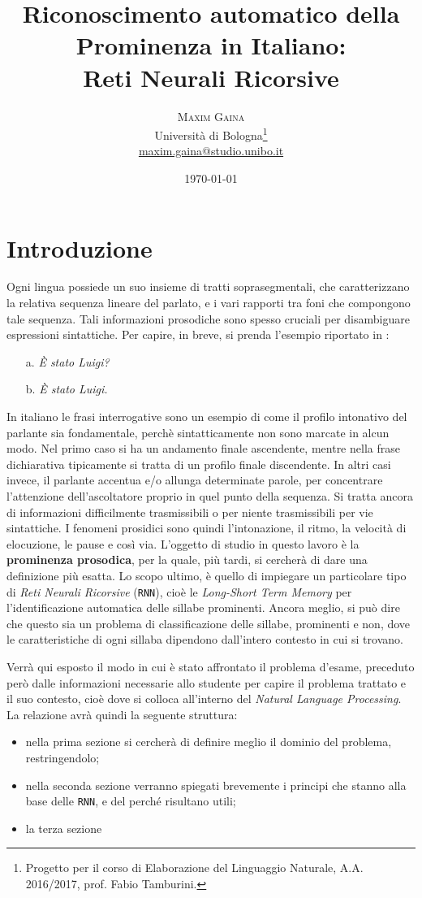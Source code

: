 \documentclass[twoside,twocolumn,10pt]{extarticle}
\title{Riconoscimento automatico della Prominenza in Italiano:\\Reti Neurali Ricorsive} %
\author{%
\textsc{Maxim Gaina} \\[1ex] %
\normalsize Università di Bologna\thanks{Progetto per il corso di Elaborazione del Linguaggio Naturale, A.A. 2016/2017, prof. Fabio Tamburini.} \\ %
\normalsize \href{mailto:maxim.gaina@studio.unibo.it}{maxim.gaina@studio.unibo.it}
}
\date{\today} %
\theoremstyle{definition}
\begin{document}
\maketitle

\tableofcontents

\section*{Introduzione}
	\lettrine[nindent = 0.4em,lines=3]{O}\space\MakeTextLowercase{g}ni lingua possiede un suo insieme di tratti soprasegmentali, che caratterizzano la relativa sequenza lineare del parlato, e i vari rapporti tra foni che compongono tale sequenza. Tali informazioni prosodiche sono spesso cruciali per disambiguare espressioni sintattiche. Per capire, in breve, si prenda l'esempio riportato in \cite{bib:fenomeni-prosodici-prominenza}:
	\begin{itemize}
		\item[a.] \textit{È stato Luigi?}
		\item[b.] \textit{È stato Luigi.}
	\end{itemize}

	In italiano le frasi interrogative sono un esempio di come il profilo intonativo del parlante sia fondamentale, perchè sintatticamente non sono marcate in alcun modo. Nel primo caso si ha un andamento finale ascendente, mentre nella frase dichiarativa tipicamente si tratta di un profilo finale discendente. In altri casi invece, il parlante accentua e/o allunga determinate parole, per concentrare l'attenzione dell'ascoltatore proprio in quel punto della sequenza.	 Si tratta ancora di informazioni difficilmente trasmissibili o per niente trasmissibili per vie sintattiche. I fenomeni prosidici sono quindi l'intonazione, il ritmo, la velocità di elocuzione, le pause e così via. L'oggetto di studio in questo lavoro è la \textbf{prominenza prosodica}, per la quale, più tardi, si cercherà di dare una definizione più esatta. Lo scopo ultimo, è quello di impiegare un particolare tipo di \textit{Reti Neurali Ricorsive} (\texttt{RNN}), cioè le \textit{Long-Short Term Memory} per l'identificazione automatica delle sillabe prominenti. Ancora meglio, si può dire che questo sia un problema di classificazione delle sillabe, prominenti e non, dove le caratteristiche di ogni sillaba dipendono dall'intero contesto in cui si trovano.
	
	Verrà qui esposto il modo in cui è stato affrontato il problema d'esame, preceduto però dalle informazioni necessarie allo studente per capire il problema trattato e il suo contesto, cioè dove si colloca all'interno del \textit{Natural Language Processing}. La relazione avrà quindi la seguente struttura:
	\begin{itemize}
		\item nella prima sezione si cercherà di definire meglio il dominio del problema, restringendolo;
		\item nella seconda sezione verranno spiegati brevemente i principi che stanno alla base delle \texttt{RNN}, e del perché risultano utili;
		\item la terza sezione
	\end{itemize}
	
\end{document}
